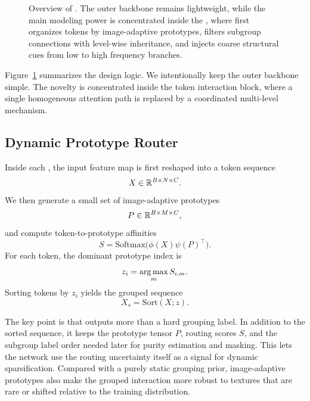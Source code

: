 \begin{figure}[t]
\centering
\resizebox{\textwidth}{!}{}
\caption{Overview of \method{}. The outer backbone remains lightweight, while the main modeling power is concentrated inside the \moduleName{}, where \dpr{} first organizes tokens by image-adaptive prototypes, \pfsa{} filters subgroup connections with level-wise inheritance, and \lmr{} injects coarse structural cues from low to high frequency branches.}
\label{fig:method-overview}
\end{figure}

Figure~\ref{fig:method-overview} summarizes the design logic. We intentionally keep the outer backbone simple. The novelty is concentrated inside the token interaction block, where a single homogeneous attention path is replaced by a coordinated multi-level mechanism.

\subsection{Dynamic Prototype Router}
Inside each \moduleName{}, the input feature map is first reshaped into a token sequence
\begin{equation}
X \in \mathbb{R}^{B \times N \times C}.
\end{equation}
We then generate a small set of image-adaptive prototypes
\begin{equation}
P \in \mathbb{R}^{B \times M \times C},
\end{equation}
and compute token-to-prototype affinities
\begin{equation}
S = \mathrm{Softmax}\bigl(\phi(X)\psi(P)^{\top}\bigr).
\end{equation}
For each token, the dominant prototype index is
\begin{equation}
z_i = \operatorname*{arg\,max}_{m} S_{i,m}.
\end{equation}
Sorting tokens by \(z_i\) yields the grouped sequence
\begin{equation}
X_s = \mathrm{Sort}(X; z).
\end{equation}

The key point is that \dpr{} outputs more than a hard grouping label. In addition to the sorted sequence, it keeps the prototype tensor \(P\), routing scores \(S\), and the subgroup label order needed later for purity estimation and masking. This lets the network use the routing uncertainty itself as a signal for dynamic sparsification. Compared with a purely static grouping prior, image-adaptive prototypes also make the grouped interaction more robust to textures that are rare or shifted relative to the training distribution.

